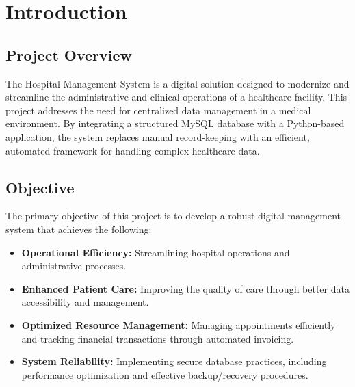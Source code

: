 \section{Introduction}

\subsection{Project Overview}

The Hospital Management System is a digital solution designed to modernize and streamline the administrative and clinical operations of a healthcare facility. This project addresses the need for centralized data management in a medical environment. By integrating a structured MySQL database with a Python-based application, the system replaces manual record-keeping with an efficient, automated framework for handling complex healthcare data.

\subsection{Objective}

The primary objective of this project is to develop a robust digital management system that achieves the following:
\begin{itemize}
    \item \textbf{Operational Efficiency:} Streamlining hospital operations and administrative processes.
    \item \textbf{Enhanced Patient Care:} Improving the quality of care through better data accessibility and management.
    \item \textbf{Optimized Resource Management:} Managing appointments efficiently and tracking financial transactions through automated invoicing.
    \item \textbf{System Reliability:} Implementing secure database practices, including performance optimization and effective backup/recovery procedures.
\end{itemize}

